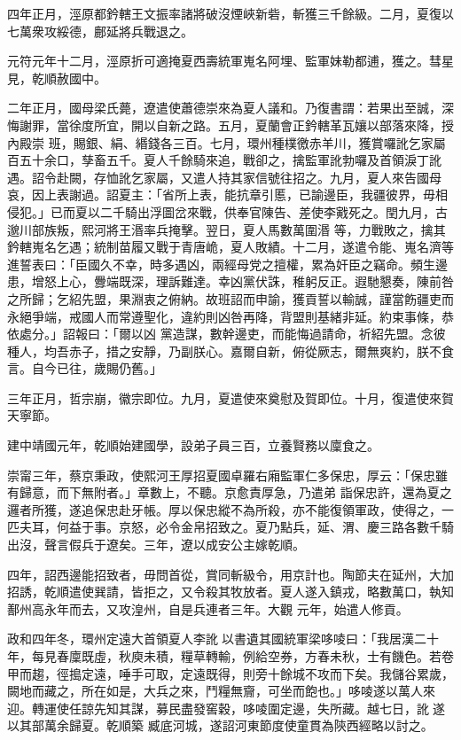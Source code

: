 \begin{pinyinscope}
 四年正月，涇原都鈐轄王文振率諸將破沒煙峽新砦，斬獲三千餘級。二月，夏復以七萬衆攻綏德，鄜延將兵戰退之。



 元符元年十二月，涇原折可適掩夏西壽統軍嵬名阿埋、監軍妹勒都逋，獲之。彗星見，乾順赦國中。



 二年正月，國母梁氏薨，遼遣使蕭德崇來為夏人議和。乃復書謂：若果出至誠，深悔謝罪，當徐度所宜，開以自新之路。五月，夏蘭會正鈐轄革瓦孃以部落來降，授內殿崇
 班，賜銀、絹、緡錢各三百。七月，環州種樸徼赤羊川，獲賞囉訛乞家屬百五十余口，孳畜五千。夏人千餘騎來追，戰卻之，擒監軍訛勃囉及首領淚丁訛遇。詔令赴闕，存恤訛乞家屬，又遣人持其家信號往招之。九月，夏人來告國母哀，因上表謝過。詔夏主：「省所上表，能抗章引慝，已諭邊臣，我疆彼界，毋相侵犯。」已而夏以二千騎出浮圖岔來戰，供奉官陳告、差使李戭死之。閏九月，古邈川部族叛，熙河將王湣率兵掩擊。翌日，夏人馬數萬圍湣
 等，力戰敗之，擒其鈐轄嵬名乞遇；統制苗履又戰于青唐峗，夏人敗績。十二月，遂遣令能、嵬名濟等進誓表曰：「臣國久不幸，時多遇凶，兩經母党之擅權，累為奸臣之竊命。頻生邊患，增怒上心，釁端既深，理訴難達。幸凶黨伏誅，稚躬反正。遐馳懇奏，陳前咎之所歸；乞紹先盟，果淵衷之俯納。故班詔而申諭，獲貢誓以輸誠，謹當飭疆吏而永絕爭端，戒國人而常遵聖化，違約則凶咎再降，背盟則基緒非延。約束事條，恭依處分。」詔報曰：「爾以凶
 黨造謀，數幹邊吏，而能悔過請命，祈紹先盟。念彼種人，均吾赤子，措之安靜，乃副朕心。嘉爾自新，俯從厥志，爾無爽約，朕不食言。自今已往，歲賜仍舊。」



 三年正月，哲宗崩，徽宗即位。九月，夏遣使來奠慰及賀即位。十月，復遣使來賀天寧節。



 建中靖國元年，乾順始建國學，設弟子員三百，立養賢務以廩食之。



 崇甯三年，蔡京秉政，使熙河王厚招夏國卓羅右廂監軍仁多保忠，厚云：「保忠雖有歸意，而下無附者。」章數上，不聽。京愈責厚急，乃遣弟
 詣保忠許，還為夏之邏者所獲，遂追保忠赴牙帳。厚以保忠縱不為所殺，亦不能復領軍政，使得之，一匹夫耳，何益于事。京怒，必令金帛招致之。夏乃點兵，延、渭、慶三路各數千騎出沒，聲言假兵于遼矣。三年，遼以成安公主嫁乾順。



 四年，詔西邊能招致者，毋問首從，賞同斬級令，用京計也。陶節夫在延州，大加招誘，乾順遣使巽請，皆拒之，又令殺其牧放者。夏人遂入鎮戎，略數萬口，執知鄯州高永年而去，又攻湟州，自是兵連者三年。大觀
 元年，始遣人修貢。



 政和四年冬，環州定遠大首領夏人李訛𠼪以書遺其國統軍梁哆㖫曰：「我居漢二十年，每見春廩既虛，秋庾未積，糧草轉輸，例給空券，方春未秋，士有饑色。若卷甲而趨，徑搗定遠，唾手可取，定遠既得，則旁十餘城不攻而下矣。我儲谷累歲，闕地而藏之，所在如是，大兵之來，鬥糧無齎，可坐而飽也。」哆㖫遂以萬人來迎。轉運使任諒先知其謀，募民盡發窖穀，哆㖫圍定邊，失所藏。越七日，訛𠼪遂以其部萬余歸夏。乾順築
 臧底河城，遂詔河東節度使童貫為陝西經略以討之。




\end{pinyinscope}
